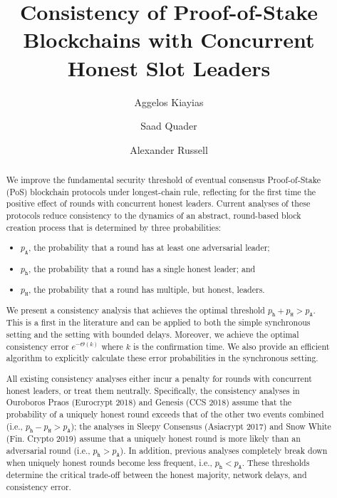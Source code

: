 \documentclass{article}
\author[1,3]{Aggelos Kiayias}
\author[2]{Saad Quader}
\author[2,3]{Alexander Russell}
\affil[1]{University of Edinburgh}
\affil[2]{University of Connecticut}
\affil[3]{IOHK}
\theoremstyle{definition}
\newcommand{\h}{\mathtt{h}}
\renewcommand{\H}{\mathtt{H}}
\newcommand{\A}{\mathtt{A}}
\begin{document}
\title{
Consistency of 
Proof-of-Stake Blockchains
with Concurrent Honest Slot Leaders%
}


\maketitle

  

\begin{abstract}
  We improve the fundamental security threshold of 
  eventual consensus Proof-of-Stake
  (PoS) blockchain protocols under longest-chain rule, 
  reflecting for the first time the
  positive effect of rounds with concurrent honest leaders.  Current
  analyses of these protocols 
  reduce consistency to the dynamics of an abstract, round-based block
  creation process that is determined by three probabilities:
  \begin{itemize}
  \item $p_\A$, the probability that a round has at least one adversarial leader;
  \item $p_\h$, the probability that a round has a single honest leader; and
  \item $p_\H$, the probability that a round has multiple, but honest, leaders.
  \end{itemize}
  We present a 
  consistency analysis that achieves the optimal threshold $p_\h + p_\H > p_\A$. 
  This is a first in the literature and can be applied
  to both the simple synchronous setting and the setting with bounded
  delays. 
  Moreover, we achieve the optimal consistency error $e^{-\Theta(k)}$ where $k$ is the confirmation time. 
  We also provide an efficient algorithm to explicitly calculate these error probabilities in the synchronous setting.

  
  All existing consistency analyses either incur a penalty
  for rounds with concurrent honest leaders, 
  or treat them neutrally. 
  Specifically, the consistency analyses in Ouroboros Praos (Eurocrypt 2018) and
  Genesis (CCS 2018) assume that the probability of a uniquely honest
  round exceeds that of the other two events combined 
  (i.e., $p_\h - p_\H > p_\A$); the analyses in
  Sleepy Consensus (Asiacrypt 2017) and Snow White (Fin. Crypto 2019)
  assume that a uniquely honest round is more likely than an
  adversarial round 
  (i.e., $p_\h > p_\A$). 
  In addition,
  previous analyses completely break down when uniquely honest rounds
  become less frequent, i.e., $p_\h < p_\A$. 
  These
  thresholds determine the critical trade-off between the honest majority,
  network delays, and consistency error.


\end{abstract}
\end{document}

